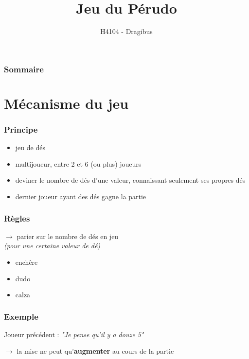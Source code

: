 \documentclass{beamer}
\title{Jeu du Pérudo}
\author{H4104 - Dragibus}
\institute{INSA de Lyon}
\begin{document}
\begin{frame}
  \titlepage
\end{frame}

\begin{frame}
  \frametitle{Sommaire}
  \tableofcontents[hideallsubsections]
\end{frame}

\section{Mécanisme du jeu}

\begin{frame}
  \frametitle{Principe}


  \begin{itemize}
    \item jeu de dés
    \item multijoueur, entre 2 et 6 (ou plus) joueurs
    \item deviner le nombre de dés d'une valeur, connaissant seulement ses
      propres dés
    \item dernier joueur ayant des dés gagne la partie
  \end{itemize}
\end{frame}

\begin{frame}
  \frametitle{Règles}
  $\to$ parier sur le nombre de dés en jeu \\
  \emph{(pour une certaine valeur de dé)}

  \begin{itemize}
    \item enchêre
    \item dudo
    \item calza
  \end{itemize}
\end{frame}

\begin{frame}
  \frametitle{Exemple}


  \begin{center}
    \begin{large}
      Joueur précédent : \textit{"Je pense qu'il y a douze 5"}
      \\
    \end{large}
  \end{center}

  $\to$ la mise ne peut qu'\textbf{augmenter} au cours de la partie
\end{frame}
\end{document}
